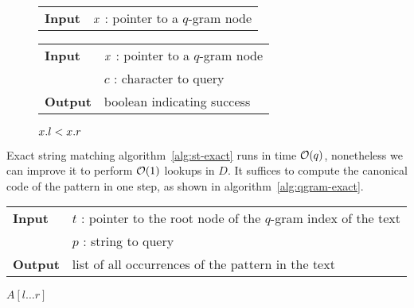 \begin{figure*}
\begin{minipage}[t]{.5\textwidth}
\begin{algorithm}[H]
\begin{tabular}{ll}
\textbf{Input}  & $x$ : pointer to a $q$-gram node\\
\end{tabular}
\begin{algorithmic}[1]
\end{algorithmic}
\label{alg:qgram-goroot}
\end{algorithm}
\end{minipage}
\hfill
\begin{minipage}[t]{.5\textwidth}
\begin{algorithm}[H]
\begin{tabular}{ll}
\textbf{Input}  & $x$ : pointer to a $q$-gram node\\
				& $c$ : character to query\\
\textbf{Output} & boolean indicating success\\
\end{tabular}
\begin{algorithmic}[1]
	\State \Return \False
\EndIf
{}
\State \Return $x.l < x.r$
\end{algorithmic}
\label{alg:qgram-godownc}
\end{algorithm}
\end{minipage}
\end{figure*}

Exact string matching algorithm~\ref{alg:st-exact} runs in time $\mathcal{O}(q)$, nonetheless we can improve it to perform $\mathcal{O}(1)$ lookups in $D$.
It suffices to compute the canonical code of the pattern in one step, as shown in algorithm~\ref{alg:qgram-exact}.

\begin{center}
\begin{minipage}[t]{.8\textwidth}
\begin{algorithm}[H]
\begin{tabular}{ll}
\textbf{Input}  & $t$ : pointer to the root node of the $q$-gram index of the text\\
				& $p$ : string to query\\
\textbf{Output} & list of all occurrences of the pattern in the text\\
\end{tabular}
\begin{algorithmic}[1]
\State \Report $A[l \dots r]$
\end{algorithmic}
\label{alg:qgram-exact}
\end{algorithm}
\end{minipage}
\end{center}

